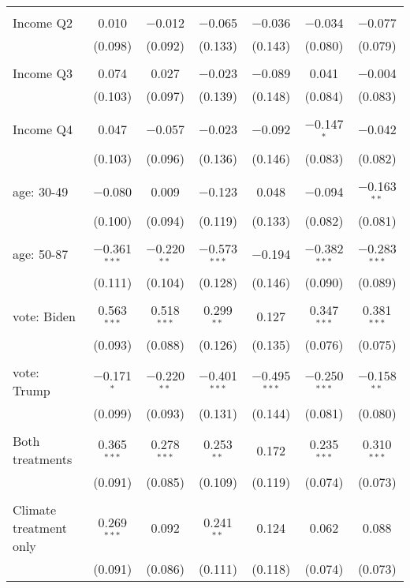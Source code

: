 \begin{tabular}{@{\extracolsep{5pt}}lcccccc}
  & & & & & & \\ 
 Income Q2 & 0.010 & $-$0.012 & $-$0.065 & $-$0.036 & $-$0.034 & $-$0.077 \\ 
  & (0.098) & (0.092) & (0.133) & (0.143) & (0.080) & (0.079) \\ 
  & & & & & & \\ 
 Income Q3 & 0.074 & 0.027 & $-$0.023 & $-$0.089 & 0.041 & $-$0.004 \\ 
  & (0.103) & (0.097) & (0.139) & (0.148) & (0.084) & (0.083) \\ 
  & & & & & & \\ 
 Income Q4 & 0.047 & $-$0.057 & $-$0.023 & $-$0.092 & $-$0.147$^{*}$ & $-$0.042 \\ 
  & (0.103) & (0.096) & (0.136) & (0.146) & (0.083) & (0.082) \\ 
  & & & & & & \\ 
 age: 30-49 & $-$0.080 & 0.009 & $-$0.123 & 0.048 & $-$0.094 & $-$0.163$^{**}$ \\ 
  & (0.100) & (0.094) & (0.119) & (0.133) & (0.082) & (0.081) \\ 
  & & & & & & \\ 
 age: 50-87 & $-$0.361$^{***}$ & $-$0.220$^{**}$ & $-$0.573$^{***}$ & $-$0.194 & $-$0.382$^{***}$ & $-$0.283$^{***}$ \\ 
  & (0.111) & (0.104) & (0.128) & (0.146) & (0.090) & (0.089) \\ 
  & & & & & & \\ 
 vote: Biden & 0.563$^{***}$ & 0.518$^{***}$ & 0.299$^{**}$ & 0.127 & 0.347$^{***}$ & 0.381$^{***}$ \\ 
  & (0.093) & (0.088) & (0.126) & (0.135) & (0.076) & (0.075) \\ 
  & & & & & & \\ 
 vote: Trump & $-$0.171$^{*}$ & $-$0.220$^{**}$ & $-$0.401$^{***}$ & $-$0.495$^{***}$ & $-$0.250$^{***}$ & $-$0.158$^{**}$ \\ 
  & (0.099) & (0.093) & (0.131) & (0.144) & (0.081) & (0.080) \\ 
  & & & & & & \\ 
 Both treatments & 0.365$^{***}$ & 0.278$^{***}$ & 0.253$^{**}$ & 0.172 & 0.235$^{***}$ & 0.310$^{***}$ \\ 
  & (0.091) & (0.085) & (0.109) & (0.119) & (0.074) & (0.073) \\ 
  & & & & & & \\ 
 Climate treatment only & 0.269$^{***}$ & 0.092 & 0.241$^{**}$ & 0.124 & 0.062 & 0.088 \\ 
  & (0.091) & (0.086) & (0.111) & (0.118) & (0.074) & (0.073) \\ 

\end{tabular}
